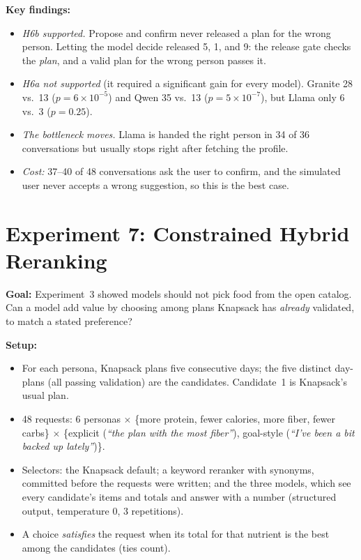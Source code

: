 \documentclass[11pt]{article}
\begin{document}
\textbf{Key findings:}
\begin{itemize}
  \item \emph{H6b supported.} Propose and confirm never released a plan for the
        wrong person. Letting the model decide released 5, 1, and 9: the
        release gate checks the \emph{plan}, and a valid plan for the wrong
        person passes it.
  \item \emph{H6a not supported} (it required a significant gain for every
        model). Granite 28 vs.\ 13 ($p=6\times10^{-5}$) and Qwen 35 vs.\ 13
        ($p=5\times10^{-7}$), but Llama only 6 vs.\ 3 ($p=0.25$).
  \item \emph{The bottleneck moves.} Llama is handed the right person in 34 of
        36 conversations but usually stops right after fetching the profile.
  \item \emph{Cost:} 37--40 of 48 conversations ask the user to confirm, and the
        simulated user never accepts a wrong suggestion, so this is the best
        case.
\end{itemize}

\section{Experiment 7: Constrained Hybrid Reranking}

\textbf{Goal:} Experiment~3 showed models should not pick food from the open
catalog. Can a model add value by choosing among plans Knapsack has
\emph{already} validated, to match a stated preference?

\textbf{Setup:}
\begin{itemize}
  \item For each persona, Knapsack plans five consecutive days; the five
        distinct day-plans (all passing validation) are the candidates.
        Candidate~1 is Knapsack's usual plan.
  \item 48 requests: 6 personas $\times$ \{more protein, fewer calories, more
        fiber, fewer carbs\} $\times$ \{explicit (\emph{``the plan with the
        most fiber''}), goal-style (\emph{``I've been a bit backed up
        lately''})\}.
  \item Selectors: the Knapsack default; a keyword reranker with synonyms,
        committed before the requests were written; and the three models,
        which see every candidate's items and totals and answer with a number
        (structured output, temperature 0, 3 repetitions).
  \item A choice \emph{satisfies} the request when its total for that nutrient
        is the best among the candidates (ties count).
\end{itemize}
\end{document}
